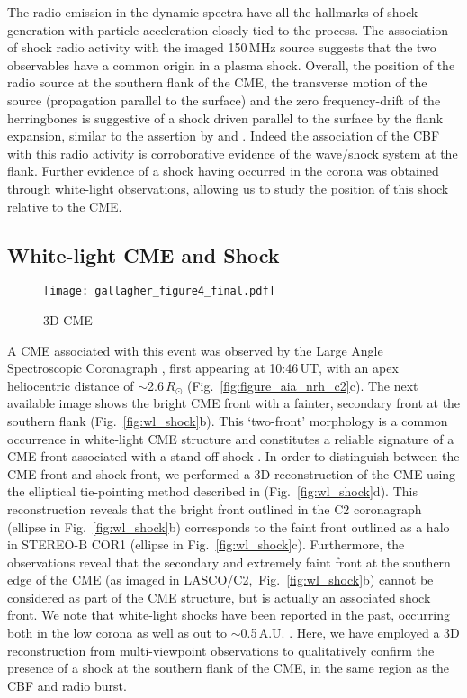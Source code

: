 The radio emission in the dynamic spectra have all the hallmarks of shock generation with particle acceleration closely tied to the process. The association of shock radio activity with the imaged 150\,MHz source suggests that the two observables have a common origin in a plasma shock. Overall, the position of the radio source at the southern flank of the CME, the transverse motion of the source (propagation parallel to the surface) and the zero frequency-drift of the herringbones is suggestive of a shock driven parallel to the surface by the flank expansion, similar to the assertion by \cite{stewart1980} and \cite{schmidt2012}. Indeed the association of the CBF with this radio activity is corroborative evidence of the wave/shock system at the flank. Further evidence of a shock having occurred in the corona was obtained through white-light observations, allowing us to study the position of this shock relative to the CME.
\clearpage


\subsection{White-light CME and Shock}
\begin{figure}[!t]
\begin{center}
\texttt{[image: gallagher\_figure4\_final.pdf]}
\caption{3D CME}
\label{fig:3d_cme}
\end{center}
\end{figure}

A CME associated with this event was observed by the Large Angle Spectroscopic Coronagraph \citep[LASCO;][]{bru95}, first appearing at 10:46\,UT, with an apex heliocentric distance of $\sim$2.6\,$R_{\odot}$ (Fig.~\ref{fig:figure_aia_nrh_c2}c). The next available image shows the bright CME front with a fainter, secondary front at the southern flank (Fig.~\ref{fig:wl_shock}b). This `two-front' morphology is a common occurrence in white-light CME structure and constitutes a reliable signature of a CME front associated with a stand-off shock \citep{vourlidas2012}. In order to distinguish between the CME front and shock front, we performed a 3D reconstruction of the CME using the elliptical tie-pointing method described in \cite{byrne2010} (Fig.~\ref{fig:wl_shock}d). 
This reconstruction reveals that the bright front outlined in the C2 coronagraph (ellipse in Fig.~\ref{fig:wl_shock}b) corresponds to the faint front outlined as a halo in STEREO-B COR1 (ellipse in Fig.~\ref{fig:wl_shock}c). 
Furthermore, the observations reveal that the secondary and extremely faint front at the southern edge of the CME (as imaged in LASCO/C2,~Fig.~\ref{fig:wl_shock}b) cannot be considered as part of the CME structure, but is actually an associated shock front. We note that white-light shocks have been reported in the past, occurring both in the low corona as well as out to $\sim$0.5\,A.U. \citep{vourlidas2012, maloney2011}. Here, we have employed a 3D reconstruction from multi-viewpoint observations to qualitatively confirm the presence of a shock at the southern flank of the CME, in the same region as the CBF and radio burst.


